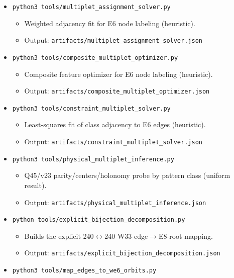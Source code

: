 \documentclass[11pt]{article}
\providecommand{\tightlist}{%
  \setlength{\itemsep}{0pt}\setlength{\parskip}{0pt}}
\begin{document}
\begin{itemize}
  \begin{itemize}
  \tightlist
  \item
    Heuristic mapping of pattern classes to E6/A2 nodes via quotient
    graph adjacency.
  \item
    Output: \texttt{artifacts/pattern\_class\_multiplet\_inference.json}
  \end{itemize}
\item
  \texttt{python3\ tools/multiplet\_assignment\_solver.py}

  \begin{itemize}
  \tightlist
  \item
    Weighted adjacency fit for E6 node labeling (heuristic).
  \item
    Output: \texttt{artifacts/multiplet\_assignment\_solver.json}
  \end{itemize}
\item
  \texttt{python3\ tools/composite\_multiplet\_optimizer.py}

  \begin{itemize}
  \tightlist
  \item
    Composite feature optimizer for E6 node labeling (heuristic).
  \item
    Output: \texttt{artifacts/composite\_multiplet\_optimizer.json}
  \end{itemize}
\item
  \texttt{python3\ tools/constraint\_multiplet\_solver.py}

  \begin{itemize}
  \tightlist
  \item
    Least‑squares fit of class adjacency to E6 edges (heuristic).
  \item
    Output: \texttt{artifacts/constraint\_multiplet\_solver.json}
  \end{itemize}
\item
  \texttt{python3\ tools/physical\_multiplet\_inference.py}

  \begin{itemize}
  \tightlist
  \item
    Q45/v23 parity/centers/holonomy probe by pattern class (uniform
    result).
  \item
    Output: \texttt{artifacts/physical\_multiplet\_inference.json}
  \end{itemize}
\item
  \texttt{python\ tools/explicit\_bijection\_decomposition.py}

  \begin{itemize}
  \tightlist
  \item
    Builds the explicit 240\ensuremath{\leftrightarrow}240
    W33-edge\ensuremath{\rightarrow}E8-root mapping.
  \item
    Output: \texttt{artifacts/explicit\_bijection\_decomposition.json}
  \end{itemize}
\item
  \texttt{python3\ tools/map\_edges\_to\_we6\_orbits.py}


\end{itemize}
\end{document}
